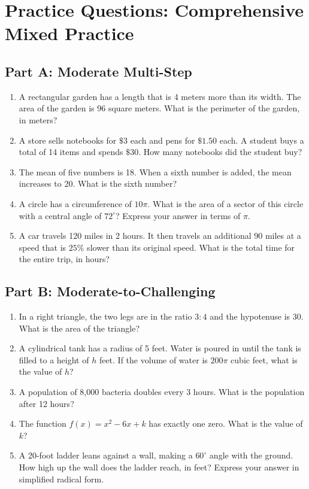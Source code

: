 \documentclass[14pt]{extarticle}
\begin{document}
\newpage

\section*{Practice Questions: Comprehensive Mixed Practice}

\subsection*{Part A: Moderate Multi-Step}
\begin{enumerate}
  \item A rectangular garden has a length that is 4 meters more than its width. The area of the garden is 96 square meters. What is the perimeter of the garden, in meters?
  \item A store sells notebooks for \(\$3\) each and pens for \(\$1.50\) each. A student buys a total of 14 items and spends \(\$30\). How many notebooks did the student buy?
  \item The mean of five numbers is 18. When a sixth number is added, the mean increases to 20. What is the sixth number?
  \item A circle has a circumference of \(10\pi\). What is the area of a sector of this circle with a central angle of \(72^\circ\)? Express your answer in terms of \(\pi\).
  \item A car travels 120 miles in 2 hours. It then travels an additional 90 miles at a speed that is \(25\%\) slower than its original speed. What is the total time for the entire trip, in hours?
\end{enumerate}

\subsection*{Part B: Moderate-to-Challenging}
\begin{enumerate}
  \item In a right triangle, the two legs are in the ratio \(3:4\) and the hypotenuse is 30. What is the area of the triangle?
  \item A cylindrical tank has a radius of 5 feet. Water is poured in until the tank is filled to a height of \(h\) feet. If the volume of water is \(200\pi\) cubic feet, what is the value of \(h\)?
  \item A population of 8{,}000 bacteria doubles every 3 hours. What is the population after 12 hours?
  \item The function \(f(x) = x^2 - 6x + k\) has exactly one zero. What is the value of \(k\)?
  \item A 20-foot ladder leans against a wall, making a \(60^\circ\) angle with the ground. How high up the wall does the ladder reach, in feet? Express your answer in simplified radical form.
\end{enumerate}
\end{document}
